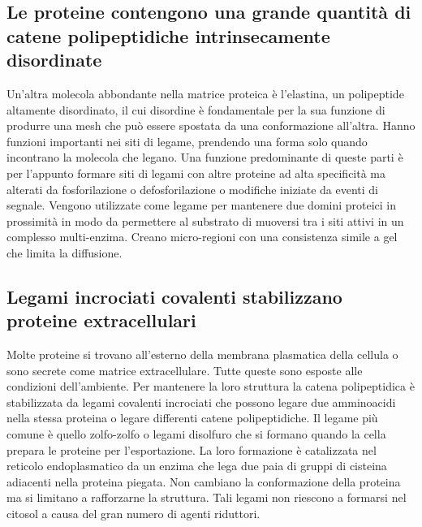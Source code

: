\subsection{Le proteine contengono una grande quantit\`a di catene polipeptidiche intrinsecamente disordinate}
Un'altra molecola abbondante nella matrice proteica \`e l'elastina, un polipeptide altamente disordinato, il cui disordine \`e fondamentale per la sua funzione di produrre una mesh che
pu\`o essere spostata da una conformazione all'altra. Hanno funzioni importanti nei siti di legame, prendendo una forma solo quando incontrano la molecola che legano. Una funzione 
predominante di queste parti \`e per l'appunto formare siti di legami con altre proteine ad alta specificit\`a ma alterati da fosforilazione o defosforilazione o modifiche iniziate da
eventi di segnale. Vengono utilizzate come legame per mantenere due domini proteici in prossimit\`a in modo da permettere al substrato di muoversi tra i siti attivi in un complesso 
multi-enzima. Creano micro-regioni con una consistenza simile a gel che limita la diffusione. 
\subsection{Legami incrociati covalenti stabilizzano proteine extracellulari}
Molte proteine si trovano all'esterno della membrana plasmatica della cellula o sono secrete come matrice extracellulare. Tutte queste sono esposte alle condizioni dell'ambiente. Per 
mantenere la loro struttura la catena polipeptidica \`e stabilizzata da legami covalenti incrociati che possono legare due amminoacidi nella stessa proteina o legare differenti catene
polipeptidiche. Il legame pi\`u comune \`e quello zolfo-zolfo o legami disolfuro che si formano quando la cella prepara le proteine per l'esportazione. La loro formazione \`e catalizzata
nel reticolo endoplasmatico da un enzima che lega due paia di gruppi  di cisteina adiacenti nella proteina piegata. Non cambiano la conformazione della proteina ma si limitano
a rafforzarne la struttura. Tali legami non riescono a formarsi nel citosol a causa del gran numero di agenti riduttori.
